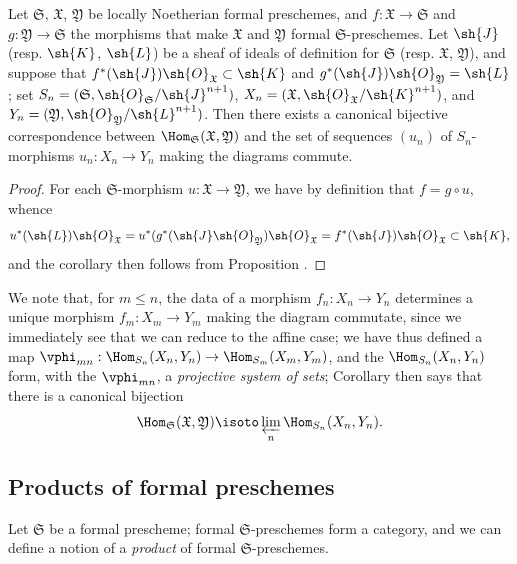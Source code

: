 \begin{corollary}[10.6.11]
\label{I.10.6.11}
Let $\mathfrak{S}$, $\mathfrak{X}$, $\mathfrak{Y}$ be locally Noetherian formal preschemes, and $f:\mathfrak{X}\to\mathfrak{S}$ and $g:\mathfrak{Y}\to\mathfrak{S}$ the morphisms that make $\mathfrak{X}$ and $\mathfrak{Y}$ formal $\mathfrak{S}$-preschemes.
Let $\sh{J}$ (resp. $\sh{K}$, $\sh{L}$) be a sheaf of ideals of definition for $\mathfrak{S}$ (resp. $\mathfrak{X}$, $\mathfrak{Y}$), and suppose that $f^*(\sh{J})\sh{O}_\mathfrak{X}\subset\sh{K}$ and $g^*(\sh{J})\sh{O}_\mathfrak{Y}=\sh{L}$; set $S_n=(\mathfrak{S},\sh{O}_\mathfrak{S}/\sh{J}^{n+1})$, $X_n=(\mathfrak{X},\sh{O}_\mathfrak{X}/\sh{K}^{n+1})$, and $Y_n=(\mathfrak{Y},\sh{O}_\mathfrak{Y}/\sh{L}^{n+1})$.
Then there exists a canonical bijective correspondence
between $\Hom_\mathfrak{S}(\mathfrak{X},\mathfrak{Y})$ and the set of sequences $(u_n)$ of $S_n$-morphisms $u_n:X_n\to Y_n$ making the diagrams  commute.
\end{corollary}

\begin{proof}
For each $\mathfrak{S}$-morphism $u:\mathfrak{X}\to\mathfrak{Y}$, we have by definition that $f=g\circ u$, whence
\[
  u^*(\sh{L})\sh{O}_\mathfrak{X}=u^*(g^*(\sh{J}\sh{O}_\mathfrak{Y})\sh{O}_\mathfrak{X}=f^*(\sh{J})\sh{O}_\mathfrak{X}\subset\sh{K},
\]
and the corollary then follows from Proposition .
\end{proof}

We note that, for $m\leq n$, the data of a morphism $f_n:X_n\to Y_n$ determines a unique morphism $f_m:X_m\to Y_m$ making the diagram  commutate, since we immediately see that we can reduce to the affine case; we have thus defined a map $\vphi_{mn}:\Hom_{S_n}(X_n,Y_n)\to\Hom_{S_m}(X_m,Y_m)$, and the $\Hom_{S_n}(X_n,Y_n)$ form, with the $\vphi_{mn}$, a \emph{projective system of sets}; Corollary  then says that there is a canonical bijection
\[
  \Hom_\mathfrak{S}(\mathfrak{X},\mathfrak{Y})\isoto\varprojlim_n\Hom_{S_n}(X_n,Y_n).
\]

\subsection{Products of formal preschemes}
\label{subsection:I.10.7}

\begin{env}[10.7.1]
\label{I.10.7.1}
Let $\mathfrak{S}$ be a formal prescheme; formal $\mathfrak{S}$-preschemes form a category, and we can define a notion of a \emph{product} of formal $\mathfrak{S}$-preschemes.
\end{env}

